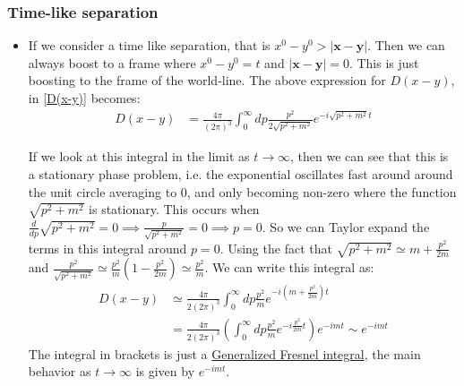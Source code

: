 \documentclass[11pt]{article}
\numberwithin{equation}{section}
\begin{document}
\subsubsection{Time-like separation}
\begin{itemize}
  \item If we consider a time like separation, that is $ x^{0}-y^{0} > |\textbf{x} - \textbf{y}|$. Then we can always boost to a frame where $x^{0}-y^{0}= t$ and $|\textbf{x} - \textbf{y}| = 0$. This is just boosting to the frame of the world-line. The above expression for  $D(x-y)$, in \ref{D(x-y)} becomes: 
\vspace{-2mm}
  \begin{align*}
  D(x-y) & = \frac{4\pi}{(2\pi)^3}\int_{0}^{\infty}dp \frac{p^2}{2\sqrt{p^2+m^2}}e^{-i\sqrt{p^2+m^2}t}
  \end{align*}

  If we look at this integral in the limit as $t \rightarrow \infty$, then we can see that this is a stationary phase problem, i.e. the exponential oscillates fast around around the unit circle averaging to $0$, and only becoming non-zero where the function $\sqrt{p^2+m^2}$ is stationary. This occurs when $\frac{d}{dp}\sqrt{p^2+m^2} = 0 \implies \frac{p}{\sqrt{p^2+m^2}} = 0 \implies p = 0 $. So we can Taylor expand the terms in this integral around $p=0$. Using the fact that $\sqrt{p^2+m^2} \simeq m+\frac{p^2}{2m}$ and $\frac{p^2}{\sqrt{p^2+m^2}} \simeq \frac{p^2}{m}(1-\frac{p^2}{2m}) \simeq \frac{p^2}{m}$. We can write this integral as: 
  \begin{align*}
   D(x-y) &\simeq  \frac{4\pi}{2(2\pi)^3}\int_{0}^{\infty}dp \frac{p^2}{m}e^{-i(m+\frac{p^2}{2m})t} \\
    & =  \frac{4\pi}{2(2\pi)^3}\left(\int_{0}^{\infty}dp \frac{p^2}{m}e^{-i\frac{p^2}{2m}t}\right)e^{-imt} \sim e^{-imt}
   \end{align*} 
   The integral in brackets is just a \href{https://en.wikipedia.org/wiki/Fresnel_integral#Generalization}{Generalized Fresnel integral}, the main behavior as $t \rightarrow \infty$ is given by $e^{-imt}$.  
\end{itemize}
\end{document}
